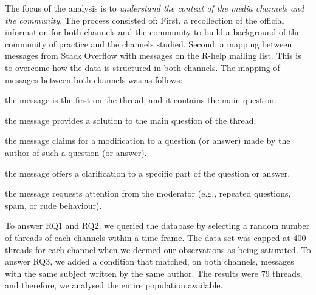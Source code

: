 	The focus of the analysis is to \textit{understand the context of the media channels and the community}.
	The process consisted of:
	First, a recollection of the official information for both channels and the community to build a background of the community of practice and the channels studied.
	Second, a mapping between messages from Stack Overflow with messages on the R-help mailing list.
    This is to overcome how the data is structured in both channels.
    The mapping of messages between both channels was as follows:

	\begin{description}[itemsep=3pt, topsep=2pt, leftmargin=3em, parsep=0pt]
		\item[Question:] the message is the first on the thread, and it contains the main question.
		\item[Answer:] the message provides a solution to the main question of the thread.
	 	\item[Update:] the message claims for a modification to a question (or answer) made by the author of such a question (or answer).
		\item[Comment:] the message offers a clarification to a specific part of the question or answer.
		\item[Flag:] the message requests attention from the moderator (e.g., repeated questions, spam, or rude behaviour).
	\end{description}

	To answer RQ1 and RQ2, we queried the database by selecting a random number of threads of each channels within a time frame.
	The data set was capped at 400 threads for each channel when we deemed our observations as being saturated.
	To answer RQ3, we added a condition that matched, on both channels, messages with the same subject written by the same author.
	The results were 79 threads, and therefore, we analysed the entire population available. 


